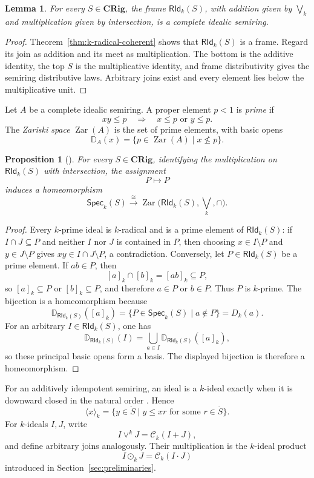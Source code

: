 \documentclass[12pt,leqno]{amsart}
\newcommand{\CRig}{\mathbf{CRig}}
\newcommand{\Speck}{\mathsf{Spec}_{k}}
\newcommand{\RIdk}{\mathsf{RId}_{k}}
\newcommand{\Zar}{\operatorname{Zar}}
\newtheorem{proposition}[theorem]{Proposition}
\newtheorem{lemma}[theorem]{Lemma}
\theoremstyle{definition}
\numberwithin{equation}{section}
\theoremstyle{remark}
\def\leq{\leqslant}
\begin{document}
\begin{lemma}\label{lem:RIdk-complete-idealic}
For every \(S\in\CRig\), the frame \(\RIdk(S)\), with addition given by \(\bigvee_k\) and multiplication given by intersection, is a complete idealic semiring.
\end{lemma}

\begin{proof}
Theorem~\ref{thm:k-radical-coherent} shows that \(\RIdk(S)\) is a frame. Regard its join as addition and its meet as multiplication. The bottom is the additive identity, the top $S$ is the multiplicative identity, and frame distributivity gives the semiring distributive laws. Arbitrary joins exist and every element lies below the multiplicative unit.
\end{proof}

Let $A$ be a complete idealic semiring. A proper element \(p<1\) is \emph{prime} if
\[
xy\leq p\quad\Longrightarrow\quad x\leq p\text{ or }y\leq p.
\]
The \emph{Zariski space} \(\Zar(A)\) is the set of prime elements, with basic opens
\[
\mathbb D_A(x)=\{p\in\Zar(A)\mid x\nleq p\}.
\]

\begin{proposition}[{\cite[Proposition~3.40]{Ray22}}]\label{prop:zar-ridk}
For every \(S\in\CRig\), identifying the multiplication on \(\RIdk(S)\) with intersection, the assignment
\[
P\longmapsto P
\]
induces a homeomorphism
\[
\Speck(S)\xrightarrow{\ \cong\ }
\Zar\bigl(\RIdk(S),\bigvee_k,\cap\bigr).
\]
\end{proposition}

\begin{proof}
Every $k$-prime ideal is $k$-radical and is a prime element of \(\RIdk(S)\): if \(I\cap J\subseteq P\) and neither $I$ nor $J$ is contained in $P$, then choosing \(x\in I\setminus P\) and \(y\in J\setminus P\) gives \(xy\in I\cap J\setminus P\), a contradiction. Conversely, let \(P\in\RIdk(S)\) be a prime element. If \(ab\in P\), then
\[
[a]_k\cap[b]_k=[ab]_k\subseteq P,
\]
so \([a]_k\subseteq P\) or \([b]_k\subseteq P\), and therefore \(a\in P\) or \(b\in P\). Thus $P$ is $k$-prime. The bijection is a homeomorphism because
\[
\mathbb D_{\RIdk(S)}([a]_k)
 =\{P\in\Speck(S)\mid a\notin P\}
 =D_k(a).
\]
For an arbitrary \(I\in\RIdk(S)\), one has
\[
\mathbb D_{\RIdk(S)}(I)=\bigcup_{a\in I}\mathbb D_{\RIdk(S)}([a]_k),
\]
so these principal basic opens form a basis. The displayed bijection is therefore a homeomorphism.
\end{proof}

For an additively idempotent semiring, an ideal is a $k$-ideal exactly when it is downward closed in the natural order \cite[Proposition~3.11]{Ray22}. Hence
\[
\langle x\rangle_k
 =\{y\in\ddot S\mid y\leq xr\text{ for some }r\in\ddot S\}.
\]
For $k$-ideals \(I,J\), write
\[
I\vee^k J=\mathcal C_k(I+J),
\]
and define arbitrary joins analogously. Their multiplication is the $k$-ideal product
\[
I\odot_kJ=\mathcal C_k(I\cdot J)
\]
introduced in Section~\ref{sec:preliminaries}.
\end{document}
